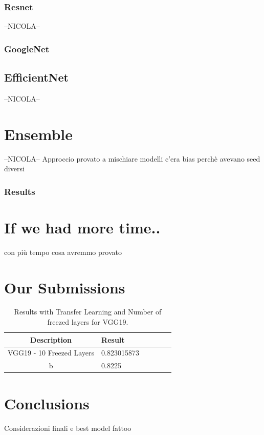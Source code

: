 \documentclass[10pt]{article}
\begin{document}
\subsubsection{Resnet}
--NICOLA--
\subsubsection{GoogleNet}
\subsection{EfficientNet}
--NICOLA--



\section{Ensemble}
--NICOLA--
Approccio
provato a mischiare modelli
          c'era bias perchè avevano seed diversi
\subsubsection{Results}



\section{If we had more time..}
con più tempo cosa avremmo provato




\section{Our Submissions}
\begin{table}[ht]
\centering
\begin{adjustbox}{width=240}
\small
\begin{tabular}{|c|l|l|l|l|l}

\hline \bf Description & \bf Result \\ \hline
VGG19 - 10 Freezed Layers & 0.823015873 \\
b & 0.8225 \\

\hline
\end{tabular}
\end{adjustbox}
\caption{Results with Transfer Learning and Number of freezed layers for VGG19.}
\end{table}
\section{Conclusions}
Considerazioni finali e best model fattoo

\end{document}
